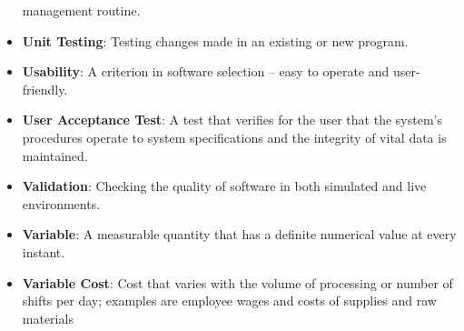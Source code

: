 \begin{itemize}
	management routine.
	\item \textbf{Unit Testing}:  Testing changes made in an existing or new program.
	\item \textbf{Usability}:  A criterion in software selection – easy to operate and user-friendly.
	\item \textbf{User Acceptance Test}:  A test that verifies for the user that the system’s procedures operate to
	system specifications and the integrity of vital data is maintained.
	\item \textbf{Validation}:  Checking the quality of software in both simulated and live environments.
	\item \textbf{Variable}:  A measurable quantity that has a definite numerical value at every instant.
	\item \textbf{Variable Cost}:  Cost that varies with the volume of processing or number of shifts per day; examples
	are employee wages and costs of supplies and raw materials
\end{itemize}